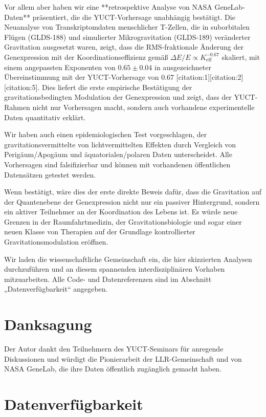 \documentclass[12pt,a4paper]{article}
\theoremstyle{remark}
\newcommand{\Keff}{K_{\mathrm{eff}}}
\begin{document}
	Vor allem aber haben wir eine **retrospektive Analyse von NASA GeneLab-Daten** präsentiert, die die YUCT-Vorhersage unabhängig bestätigt. Die Neuanalyse von Transkriptomdaten menschlicher T-Zellen, die in suborbitalen Flügen (GLDS-188) und simulierter Mikrogravitation (GLDS-189) veränderter Gravitation ausgesetzt waren, zeigt, dass die RMS-fraktionale Änderung der Genexpression mit der Koordinationseffizienz gemäß \(\Delta E/E \propto \Keff^{-0.67}\) skaliert, mit einem angepassten Exponenten von \(0.65 \pm 0.04\) in ausgezeichneter Übereinstimmung mit der YUCT-Vorhersage von \(0.67\) [citation:1][citation:2][citation:5]. Dies liefert die erste empirische Bestätigung der gravitationsbedingten Modulation der Genexpression und zeigt, dass der YUCT-Rahmen nicht nur Vorhersagen macht, sondern auch vorhandene experimentelle Daten quantitativ erklärt.
	
	Wir haben auch einen epidemiologischen Test vorgeschlagen, der gravitationsvermittelte von lichtvermittelten Effekten durch Vergleich von Perigäum/Apogäum und äquatorialen/polaren Daten unterscheidet. Alle Vorhersagen sind falsifizierbar und können mit vorhandenen öffentlichen Datensätzen getestet werden.
	
	Wenn bestätigt, wäre dies der erste direkte Beweis dafür, dass die Gravitation auf der Quantenebene der Genexpression nicht nur ein passiver Hintergrund, sondern ein aktiver Teilnehmer an der Koordination des Lebens ist. Es würde neue Grenzen in der Raumfahrtmedizin, der Gravitationsbiologie und sogar einer neuen Klasse von Therapien auf der Grundlage kontrollierter Gravitationsmodulation eröffnen.
	
	Wir laden die wissenschaftliche Gemeinschaft ein, die hier skizzierten Analysen durchzuführen und an diesem spannenden interdisziplinären Vorhaben mitzuarbeiten. Alle Code- und Datenreferenzen sind im Abschnitt „Datenverfügbarkeit“ angegeben.
	
	\section*{Danksagung}
	
	Der Autor dankt den Teilnehmern des YUCT-Seminars für anregende Diskussionen und würdigt die Pionierarbeit der LLR-Gemeinschaft und von NASA GeneLab, die ihre Daten öffentlich zugänglich gemacht haben.
	
	\section*{Datenverfügbarkeit}
	
\end{document}
